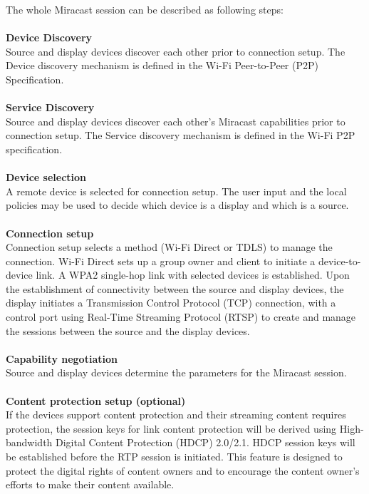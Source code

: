 The whole Miracast session can be described as following steps:\\
\\
\textbf{Device Discovery}\\
Source and display devices discover each other prior to connection setup. The Device discovery mechanism is defined in the Wi-Fi Peer-to-Peer (P2P) Specification. \\
\\
\textbf{Service Discovery}\\
Source and display devices discover each other's Miracast capabilities prior to connection setup. The Service discovery mechanism is defined in the Wi-Fi P2P specification. \\
\\
\textbf{Device selection}\\
A remote device is selected for connection setup. The user input and the local policies may be used to decide which device is a display and which is a source. \\
\\
\textbf{Connection setup} \\
Connection setup selects a method (Wi-Fi Direct or TDLS) to manage the connection. Wi-Fi Direct sets up a group owner and client to initiate a device-to-device link. A WPA2 single-hop link with selected devices is established. Upon the establishment of connectivity between the source and display devices, the display initiates a Transmission Control Protocol (TCP) connection, with a control port using Real-Time Streaming Protocol (RTSP) to create and manage the sessions between the source and the display devices. \\ 
\\
\textbf{Capability negotiation} \\
Source and display devices determine the parameters for the Miracast session. \\ 
\\  
\textbf{Content protection setup (optional)}\\
If the devices support content protection and their streaming content requires
protection, the session keys for link content protection will be derived using High-bandwidth Digital Content Protection (HDCP) 2.0/2.1. HDCP session keys will be established before the RTP session is initiated. This feature is designed to protect the digital rights of content owners and to encourage the content owner's efforts to make their content available. \\
\\
